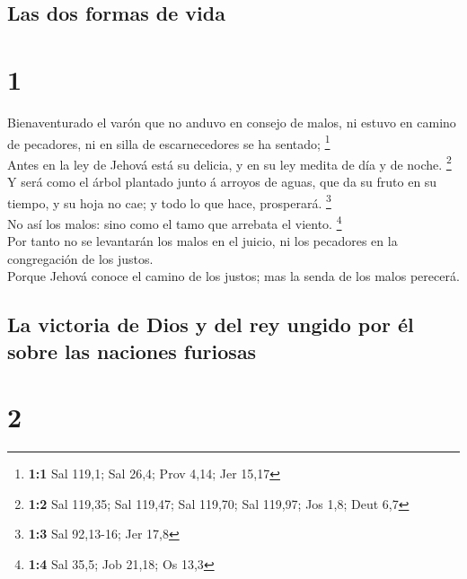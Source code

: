 \hypertarget{las-dos-formas-de-vida}{%
\subsection{Las dos formas de vida}\label{las-dos-formas-de-vida}}

\hypertarget{section}{%
\section{1}\label{section}}

 Bienaventurado el varón que no anduvo en consejo de
malos, ni estuvo en camino de pecadores, ni en silla de escarnecedores
se ha sentado; \footnote{\textbf{1:1} Sal 119,1; Sal 26,4; Prov 4,14;
  Jer 15,17}\\
 Antes en la ley de Jehová está su delicia, y en su ley
medita de día y de noche. \footnote{\textbf{1:2} Sal 119,35; Sal 119,47;
  Sal 119,70; Sal 119,97; Jos 1,8; Deut 6,7}\\
 Y será como el árbol plantado junto á arroyos de aguas,
que da su fruto en su tiempo, y su hoja no cae; y todo lo que hace,
prosperará. \footnote{\textbf{1:3} Sal 92,13-16; Jer 17,8}\\
 No así los malos: sino como el tamo que arrebata el
viento. \footnote{\textbf{1:4} Sal 35,5; Job 21,18; Os 13,3}\\
 Por tanto no se levantarán los malos en el juicio, ni los
pecadores en la congregación de los justos.\\
 Porque Jehová conoce el camino de los justos; mas la
senda de los malos perecerá.

\hypertarget{la-victoria-de-dios-y-del-rey-ungido-por-uxe9l-sobre-las-naciones-furiosas}{%
\subsection{La victoria de Dios y del rey ungido por él sobre las
naciones
furiosas}\label{la-victoria-de-dios-y-del-rey-ungido-por-uxe9l-sobre-las-naciones-furiosas}}

\hypertarget{section-1}{%
\section{2}\label{section-1}}

